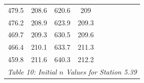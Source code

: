 \begin{center}
\begin{tabular}{|cccc||cccc||cc|}
    479.5    & 208.6                    & 620.6 & 209                           &          &                         &       &                               &          &                                     \\
    476.2    & 208.9                    & 623.9 & 209.3                         &          &                         &       &                               &          &                                     \\
    469.7    & 209.3                    & 630.5 & 209.6                         &          &                         &       &                               &          &                                     \\
    466.4    & 210.1                    & 633.7 & 211.3                         &          &                         &       &                               &          &                                     \\
    459.8    & 211.6                    & 640.3 & 212.2                         &          &                         &       &                               &          &                                     \\
    \hline\multicolumn{10}{c}{\emph{Table 10: Initial $n$ Values for Station 5.39}}
\end{tabular}


\end{center}

